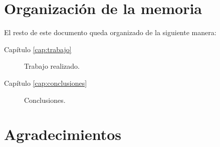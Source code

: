 \section{Organización de la memoria}

El resto de este documento queda organizado de la siguiente manera:
\begin{description}
\item[Capítulo \ref{cap:trabajo}] Trabajo realizado.
\item[Capítulo \ref{cap:conclusiones}] Conclusiones.
\end{description}


\section{Agradecimientos}
